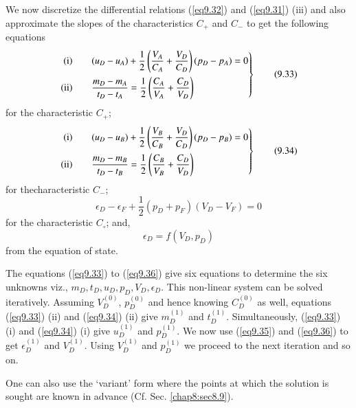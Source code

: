 We now discretize the differential relations (\ref{eq9.32}) and (\ref{eq9.31}) (iii) and also approximate the slopes of the characteristics $C_+$ and $C_-$ to get the following equations
\begin{equation*}
\left. 
\begin{aligned}
{\rm (i)} & \qquad (u_D - u_A) + \frac{1}{2} \left(\frac{V_A}{C_A} +
\frac{V_D}{C_D}\right) (p_D - p_A) = 0\\ 
{\rm (ii)} & \qquad \frac{m_D - m_A}{t_D - t_A} = \frac{1}{2}
\left(\frac{C_A}{V_A} + \frac{C_D}{V_D}\right) 
\end{aligned}
\right\} \tag{9.33}\label{eq9.33}
\end{equation*}
for the characteristic $C_+$;
\begin{equation*}
\left. 
\begin{aligned}
{\rm (i)} & \qquad (u_D - u_B) + \frac{1}{2} \left(\frac{V_B}{C_B} +
\frac{V_D}{C_D}\right) (p_D - p_B) = 0\\ 
{\rm (ii)} & \qquad \frac{m_D - m_B}{t_D - t_B} = \frac{1}{2}
\left(\frac{C_B}{V_B} + \frac{C_D}{V_D}\right) 
\end{aligned}
\right\} \tag{9.34}\label{eq9.34}
\end{equation*}
for the\pageoriginale characteristic $C_-$;
\begin{equation*}
\epsilon_D - \epsilon_F + \frac{1}{2} (p_D+p_F) (V_D - V_F) = 0
\tag{9.35}\label{eq9.35}
\end{equation*}
for the characteristic $C_\circ$; and, 
\begin{equation*}
\epsilon_D = f(V_D, p_D)\tag{9.36}\label{eq9.36}
\end{equation*}
from the equation of state.

The equations (\ref{eq9.33}) to (\ref{eq9.36}) give six equations to
determine the six unknowns viz., $m_D, t_D, u_D, p_D, V_D,
\epsilon_D$. This non-linear system can be solved
iteratively. Assuming $V^{(0)}_D$, $p^{(0)}_D$ and hence
knowing $C^{(0)}_D$ as well, equations (\ref{eq9.33}) (ii) and
(\ref{eq9.34}) (ii) give $m^{(1)}_D$ and $t^{(1)}_D$. Simultaneously,
(\ref{eq9.33}) (i) and (\ref{eq9.34}) (i) give $u^{(1)}_D$ and
$p^{(1)}_D$. We now use (\ref{eq9.35}) and (\ref{eq9.36}) to get
$\epsilon^{(1)}_D$ and $V^{(1)}_D$. Using $V^{(1)}_D$ and $p^{(1)}_D$
we proceed to the next iteration and so on. 

One can also use the `variant' form where the points at which the solution is sought are known in advance (Cf. Sec. \ref{chap8:sec8.9}).

